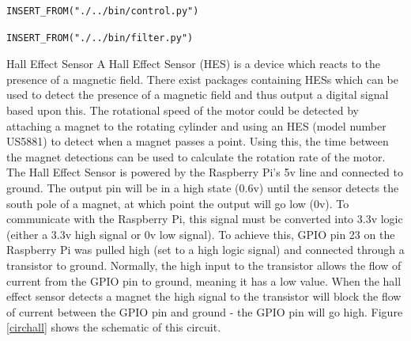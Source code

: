 \documentclass[twoside,a4]{report}
\def\br{\newline \newline \noindent}
\begin{document}
\begin{Verbatim}[frame=single,fontsize=\footnotesize]
INSERT_FROM("./../bin/control.py")
\end{Verbatim}
\begin{Verbatim}[frame=single,fontsize=\footnotesize]
INSERT_FROM("./../bin/filter.py")
\end{Verbatim}
\large Hall Effect Sensor \normalsize \br
A Hall Effect Sensor (HES) is a device which reacts to the presence of a magnetic field. There exist packages containing HESs which can be used to detect the presence of a magnetic field and thus output a digital signal based upon this. The rotational speed of the motor could be detected by attaching a magnet to the rotating cylinder and using an HES (model number US5881) to detect when a magnet passes a point. Using this, the time between the magnet detections can be used to calculate the rotation rate of the motor. \br
The Hall Effect Sensor is powered by the Raspberry Pi's 5v line and connected to ground. The output pin will be in a high state (0.6v) until the sensor detects the south pole of a magnet, at which point the output will go low (0v). To communicate with the Raspberry Pi, this signal must be converted into 3.3v logic (either a 3.3v high signal or 0v low signal). To achieve this, GPIO pin 23 on the Raspberry Pi was pulled high (set to a high logic signal) and connected through a transistor to ground. Normally, the high input to the transistor allows the flow of current from the GPIO pin to ground, meaning it has a low value. When the hall effect sensor detects a magnet the high signal to the transistor will block the flow of current between the GPIO pin and ground - the GPIO pin will go high. Figure \ref{circhall} shows the schematic of this circuit. \newline
\end{document}
